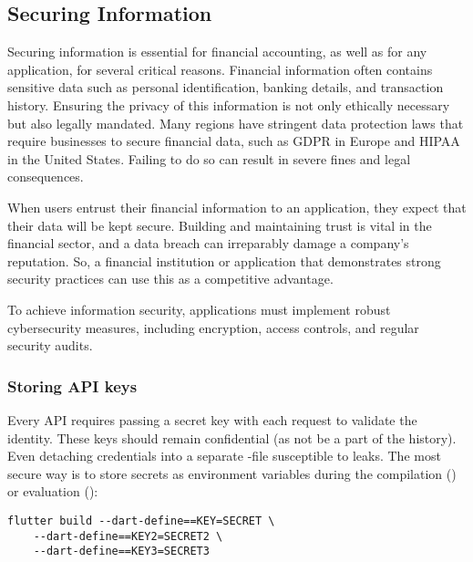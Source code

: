 
\subsection{Securing Information}

Securing information is essential for financial accounting, as well as for any application, for several critical 
reasons. Financial information often contains sensitive data such as personal identification, banking details, and 
transaction history. Ensuring the privacy of this information is not only ethically necessary but also legally mandated. 
Many regions have stringent data protection laws that require businesses to secure financial data, such as GDPR in 
Europe and HIPAA in the United States. Failing to do so can result in severe fines and legal consequences.

When users entrust their financial information to an application, they expect that their data will be kept secure. 
Building and maintaining trust is vital in the financial sector, and a data breach can irreparably damage a company's 
reputation. So, a financial institution or application that demonstrates strong security practices can use this as a 
competitive advantage.

To achieve information security, applications must implement robust cybersecurity measures, including encryption, 
access controls, and regular security audits.


\subsubsection{Storing API keys}

Every API requires passing a secret key with each request to validate the identity. These keys should remain 
confidential (as not be a part of the  history). Even detaching credentials into a separate -file  
susceptible to leaks. The most secure way is to store secrets as environment variables during the compilation 
() or evaluation ():

\begin{lstlisting}[language=terminal]
flutter build --dart-define==KEY=SECRET \
    --dart-define==KEY2=SECRET2 \
    --dart-define==KEY3=SECRET3
\end{lstlisting}

